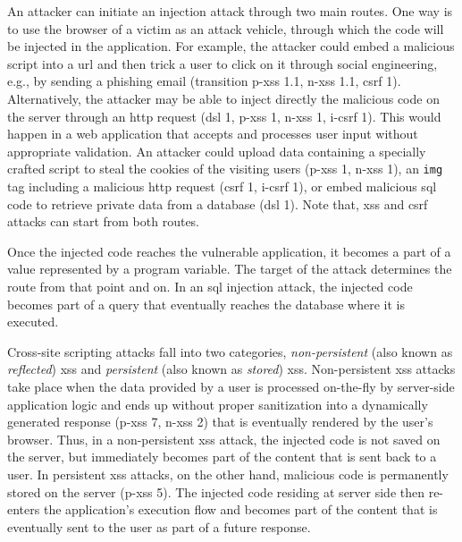 \documentclass[10pt,journal,compsoc]{IEEEtran}
\begin{document}
An attacker can initiate an injection attack through two main routes.
One way is to use the browser of a victim as an attack
vehicle, through which the code will be injected in the application.
For example, the attacker could embed a malicious script into a {\sc
  url} and then trick a user to click on it through social
engineering, e.g., by sending a phishing email (transition {\sc p-xss} 1.1, {\sc
  n-xss} 1.1, {\sc csrf} 1). Alternatively, the attacker may be able
to inject directly the malicious code on the server through an {\sc http} request
({\sc dsl} 1, {\sc p-xss} 1, {\sc n-xss} 1, {\sc i-csrf} 1). This would happen
in a web application that accepts and processes user input
without appropriate validation. An attacker could upload data
containing a specially crafted script
to steal the cookies of the visiting users ({\sc p-xss} 1, {\sc n-xss} 1),
an {\tt img} tag including a malicious {\sc http} request ({\sc csrf 1}, {\sc
i-csrf 1}),
or embed malicious
{\sc sql} code to retrieve private data from a database ({\sc dsl} 1).
Note that, {\sc xss} and {\sc csrf} attacks can start from both routes.

Once the injected code reaches the vulnerable application, it becomes
a part of a value represented by a program variable. The target of the
attack determines the route from that point and on. In an {\sc sql} injection
attack, the injected code becomes part of a query that
eventually reaches the database where it is executed.

Cross-site scripting attacks fall into two categories, {\it non-persistent}
(also known as \emph{reflected}) {\sc xss}
and {\it persistent} (also known as \emph{stored}) {\sc xss}.
Non-persistent {\sc xss} attacks take place when the
data provided by a user is processed on-the-fly
by server-side application logic and ends up without proper sanitization
into a dynamically generated response ({\sc p-xss} 7, {\sc n-xss} 2)
that is eventually rendered by the user's browser.
Thus, in a non-persistent {\sc xss} attack, the injected code
is not saved on the server, but immediately becomes part of the
content that is sent back to a user.
In persistent {\sc xss} attacks, on the other hand,
malicious code is permanently stored on the server ({\sc p-xss} 5).
The injected code residing at server side then re-enters the
application's execution flow and becomes part of the content that is
eventually sent to the user as part of a future response.
\end{document}
